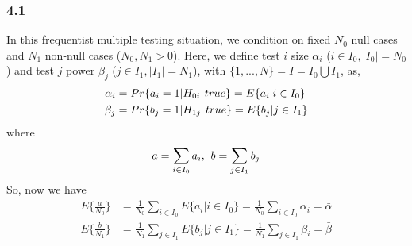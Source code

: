 \documentclass{article}\usepackage{graphicx, color}
\begin{document}
\subsubsection*{4.1}
In this frequentist multiple testing situation, we condition on fixed
$N_0$ null cases and $N_1$ non-null cases ($N_0,N_1 > 0$).
Here, we define test $i$ size $\alpha_i$ ($i \in I_0, |I_0|=N_0$) and
test $j$ power $\beta_j$ ($j \in I_1, |I_1| = N_1$), 
with $\{1,...,N\} = I = I_0 \bigcup I_1$, as,  
\begin{displaymath}
\begin{split}
\alpha_i &= Pr\{a_i = 1 | H_{0i} \hspace{4 pt} true\} = E\{a_i | i\in I_0\}\\
\beta_j &= Pr\{b_j = 1 | H_{1j} \hspace{4 pt} true\} = E\{b_j | j\in I_1\}
\end{split}
\end{displaymath}
where
\begin{displaymath}
a = \sum_{i\in I_0} a_i, \hspace{4 pt} b = \sum_{j \in I_1} b_j
\end{displaymath}
So, now we have
\begin{displaymath}
\begin{split}
E\{\frac{a}{N_0}\} & = \frac{1}{N_0} \sum_{i\in I_0} E\{a_i | i\in I_0\} 
= \frac{1}{N_0} \sum_{i\in I_0} \alpha_i = \bar{\alpha} \\
E\{\frac{b}{N_1}\} & = \frac{1}{N_1} \sum_{j\in I_1} E\{b_j | j\in I_1\} 
= \frac{1}{N_1} \sum_{j\in I_1} \beta_i = \bar{\beta} 
\end{split}
\end{displaymath}
\end{document}
